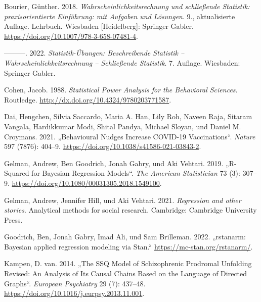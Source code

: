 \documentclass[
  a4paper,
  DIV=11]{scrreprt}
\newlength{\cslhangindent}
\newlength{\cslentryspacingunit} %
\newenvironment{CSLReferences}[2] %
 {%
  \setlength{\parindent}{0pt}
  \ifodd #1
  \let\oldpar\par
  \def\par{\hangindent=\cslhangindent\oldpar}
  \fi
  \setlength{\parskip}{#2\cslentryspacingunit}
 }%
 {}
\theoremstyle{definition}
\theoremstyle{remark}
\begin{document}
\hypertarget{refs}{}
\begin{CSLReferences}{1}{0}
\leavevmode{}%
Bourier, Günther. 2018. \emph{Wahrscheinlichkeitsrechnung und
schließende Statistik: praxisorientierte Einführung: mit Aufgaben und
Lösungen}. 9., aktualisierte Auflage. Lehrbuch. Wiesbaden
{[}Heidelberg{]}: Springer Gabler.
\url{https://doi.org/10.1007/978-3-658-07481-4}.

\leavevmode{}%
---------. 2022. \emph{Statistik-Übungen: Beschreibende Statistik --
Wahrscheinlichkeitsrechnung -- Schließende Statistik}. 7. Auflage.
Wiesbaden: Springer Gabler.

\leavevmode{}%
Cohen, Jacob. 1988. \emph{Statistical Power Analysis for the Behavioral
Sciences}. Routledge. \url{http://dx.doi.org/10.4324/9780203771587}.

\leavevmode{}%
Dai, Hengchen, Silvia Saccardo, Maria A. Han, Lily Roh, Naveen Raja,
Sitaram Vangala, Hardikkumar Modi, Shital Pandya, Michael Sloyan, und
Daniel M. Croymans. 2021. {„Behavioural Nudges Increase {COVID}-19
Vaccinations``}. \emph{Nature} 597 (7876): 404--9.
\url{https://doi.org/10.1038/s41586-021-03843-2}.

\leavevmode{}%
Gelman, Andrew, Ben Goodrich, Jonah Gabry, und Aki Vehtari. 2019.
{„R-Squared for Bayesian Regression Models``}. \emph{The American
Statistician} 73 (3): 307--9.
\url{https://doi.org/10.1080/00031305.2018.1549100}.

\leavevmode{}%
Gelman, Andrew, Jennifer Hill, und Aki Vehtari. 2021. \emph{Regression
and other stories}. Analytical methods for social research. Cambridge:
Cambridge University Press.

\leavevmode{}%
Goodrich, Ben, Jonah Gabry, Imad Ali, und Sam Brilleman. 2022.
{„rstanarm: {Bayesian} applied regression modeling via {Stan}.``}
\url{https://mc-stan.org/rstanarm/}.

\leavevmode{}%
Kampen, D. van. 2014. {„The {SSQ} Model of Schizophrenic Prodromal
Unfolding Revised: An Analysis of Its Causal Chains Based on the
Language of Directed Graphs``}. \emph{European Psychiatry} 29 (7):
437--48. \url{https://doi.org/10.1016/j.eurpsy.2013.11.001}.


\end{CSLReferences}
\end{document}
